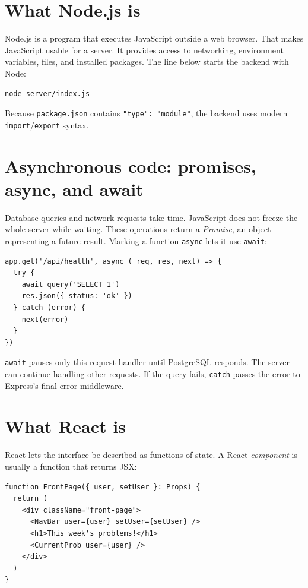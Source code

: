 \documentclass[11pt,oneside]{book}
\newcommand{\file}[1]{\texttt{#1}}
\newcommand{\code}[1]{\texttt{#1}}
\begin{document}
\section{What Node.js is}
Node.js is a program that executes JavaScript outside a web browser. That makes JavaScript usable for a server. It provides access to networking, environment variables, files, and installed packages. The line below starts the backend with Node:

\begin{lstlisting}[language={},numbers=none]
node server/index.js
\end{lstlisting}

Because \file{package.json} contains \code{"type": "module"}, the backend uses modern \code{import}/\code{export} syntax.

\section{Asynchronous code: promises, async, and await}
Database queries and network requests take time. JavaScript does not freeze the whole server while waiting. These operations return a \emph{Promise}, an object representing a future result. Marking a function \code{async} lets it use \code{await}:

\begin{lstlisting}
app.get('/api/health', async (_req, res, next) => {
  try {
    await query('SELECT 1')
    res.json({ status: 'ok' })
  } catch (error) {
    next(error)
  }
})
\end{lstlisting}

\code{await} pauses only this request handler until PostgreSQL responds. The server can continue handling other requests. If the query fails, \code{catch} passes the error to Express's final error middleware.

\section{What React is}
React lets the interface be described as functions of state. A React \emph{component} is usually a function that returns JSX:

\begin{lstlisting}
function FrontPage({ user, setUser }: Props) {
  return (
    <div className="front-page">
      <NavBar user={user} setUser={setUser} />
      <h1>This week's problems!</h1>
      <CurrentProb user={user} />
    </div>
  )
}
\end{lstlisting}
\end{document}
